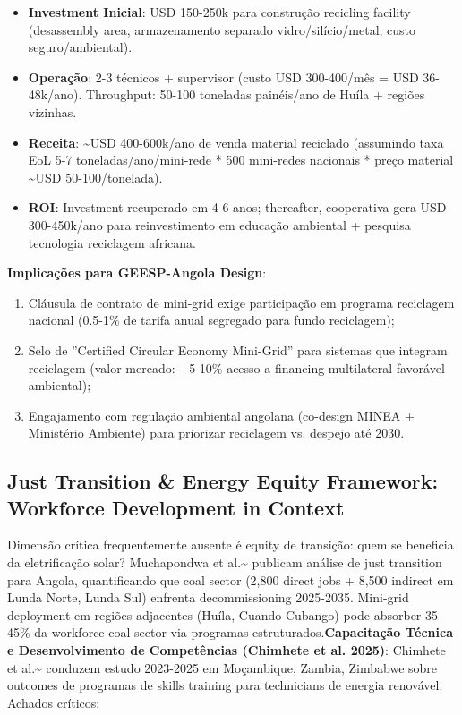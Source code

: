 \documentclass[12pt, a4paper]{article}
\begin{document}
\begin{itemize}
\item \textbf{Investment Inicial}: USD 150-250k para construção recicling facility (desassembly area, armazenamento separado vidro/silício/metal, custo seguro/ambiental).
\item \textbf{Operação}: 2-3 técnicos + supervisor (custo USD 300-400/mês = USD 36-48k/ano). Throughput: 50-100 toneladas painéis/ano de Huíla + regiões vizinhas.
\item \textbf{Receita}: \textasciitilde{}USD 400-600k/ano de venda material reciclado (assumindo taxa EoL 5-7 toneladas/ano/mini-rede * 500 mini-redes nacionais * preço material \textasciitilde{}USD 50-100/tonelada).
\item \textbf{ROI}: Investment recuperado em 4-6 anos; thereafter, cooperativa gera USD 300-450k/ano para reinvestimento em educação ambiental + pesquisa tecnologia reciclagem africana.
\end{itemize}

\textbf{Implicações para GEESP-Angola Design}:
\begin{enumerate}
\item Cláusula de contrato de mini-grid exige participação em programa reciclagem nacional (0.5-1\% de tarifa anual segregado para fundo reciclagem);
\item Selo de ''Certified Circular Economy Mini-Grid'' para sistemas que integram reciclagem (valor mercado: +5-10\% acesso a financing multilateral favorável ambiental);
\item Engajamento com regulação ambiental angolana (co-design MINEA + Ministério Ambiente) para priorizar reciclagem vs. despejo até 2030.
\end{enumerate}

\subsection{Just Transition \& Energy Equity Framework: Workforce Development in Context}

Dimensão crítica frequentemente ausente é equity de transição: quem se beneficia da eletrificação solar? Muchapondwa et al.\textasciitilde{}\citep{Muchapondwa2024} publicam análise de just transition para Angola, quantificando que coal sector (2,800 direct jobs + 8,500 indirect em Lunda Norte, Lunda Sul) enfrenta decommissioning 2025-2035. Mini-grid deployment em regiões adjacentes (Huíla, Cuando-Cubango) pode absorber 35-45\% da workforce coal sector via programas estruturados.\textbf{Capacitação Técnica e Desenvolvimento de Competências (Chimhete et al. 2025)}: Chimhete et al.\textasciitilde{}\citep{Chimhete2025} conduzem estudo 2023-2025 em Moçambique, Zambia, Zimbabwe sobre outcomes de programas de skills training para technicians de energia renovável. Achados críticos:
\end{document}
